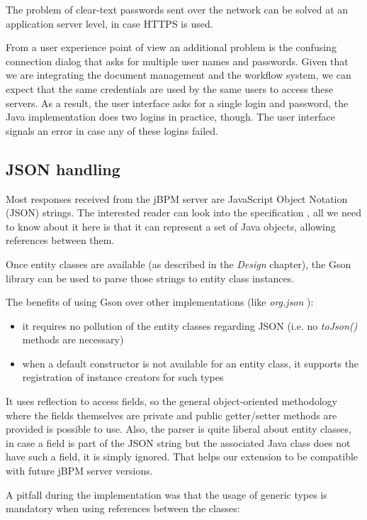 The problem of clear-text passwords sent over the network can be solved at an
application server level, in case HTTPS is used.

From a user experience point of view an additional problem is the confusing
connection dialog that asks for multiple user names and passwords. Given that
we are integrating the document management and the workflow system, we can
expect that the same credentials are used by the same users to access these
servers. As a result, the user interface asks for a single login and password,
the Java implementation does two logins in practice, though. The user interface
signals an error in case any of these logins failed.

\subsection{JSON handling}

Most responses received from the jBPM server are JavaScript Object Notation
(JSON) strings. The interested reader can look into the
specification \cite{json}, all we need to know about it here is that it can
represent a set of Java objects, allowing references between them.

Once entity classes are available (as described in the \emph{Design} chapter),
the Gson library \cite{gson} can be used to parse those strings to entity class
instances.

The benefits of using Gson over other implementations (like
\emph{org.json} \cite{org-json}):

\begin{itemize}
\item it requires no pollution of the entity classes regarding JSON (i.e. no \emph{toJson()} methods are necessary)
\item when a default constructor is not available for an entity class, it supports the registration of instance creators for such types
\end{itemize}

It uses reflection to access fields, so the general object-oriented methodology
where the fields themselves are private and public getter/setter methods are
provided is possible to use. Also, the parser is quite liberal about entity
classes, in case a field is part of the JSON string but the associated Java
class does not have such a field, it is simply ignored. That helps our
extension to be compatible with future jBPM server versions.

A pitfall during the implementation was that the usage of generic types is
mandatory when using references between the classes:

